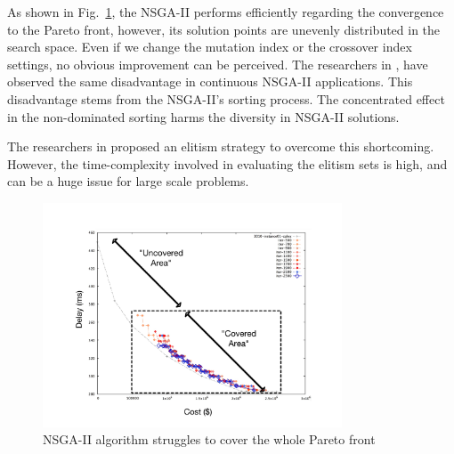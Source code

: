 \documentclass[10pt,journal,compsoc]{IEEEtran}
\newcommand{\Fig}[1]{Fig.~\ref{#1}}
\begin{document}
As shown in \Fig{nsgalabel}, the NSGA-II performs efficiently regarding the convergence to the Pareto front, however, its solution points are unevenly distributed in the search space.  Even if we change the mutation index or the crossover index settings, no obvious improvement can be perceived. The researchers in 
\cite{doi:10.1163/156939308784160703}, have observed the same disadvantage in continuous NSGA-II applications. This disadvantage stems from the NSGA-II's sorting process. The concentrated effect in the non-dominated sorting harms the diversity in NSGA-II solutions. %

The researchers in \cite{doi:10.1163/156939308784160703} proposed an elitism strategy to overcome this shortcoming. However, the time-complexity involved in evaluating the elitism sets is high, and can be a huge issue for large scale problems.
\begin{figure}[h]
\centerline{\includegraphics[page=1,width=3.5in]{nsgaitertest_label.pdf}}
\caption{NSGA-II algorithm struggles to cover the whole Pareto front} 
\label{nsgalabel}
\end{figure} 
\end{document}
